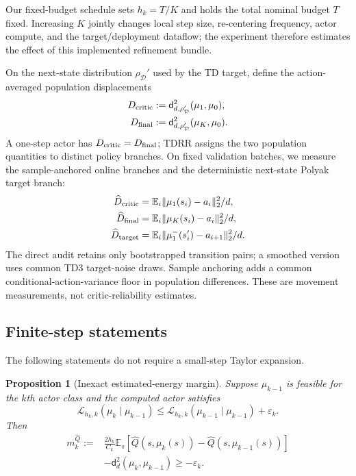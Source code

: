 \documentclass[letterpaper]{article}
\newtheorem{proposition}{Proposition}
\begin{document}
Our fixed-budget schedule sets $h_k=T/K$ and holds the total nominal budget
$T$ fixed. Increasing $K$ jointly changes local step size, re-centering
frequency, actor compute, and the target/deployment dataflow; the experiment
therefore estimates the effect of this implemented refinement bundle.

On the next-state distribution $\rho_{\mathcal D}'$ used by the TD target,
define the action-averaged population displacements
\begin{equation}
\begin{aligned}
D_{\rm critic}&:=\mathsf d_{d,\rho_{\mathcal D}'}^2(\mu_1,\mu_0),\\
D_{\rm final}&:=\mathsf d_{d,\rho_{\mathcal D}'}^2(\mu_K,\mu_0).
\end{aligned}
\label{eq:displacements}
\end{equation}
A one-step actor has $D_{\rm critic}=D_{\rm final}$; TDRR assigns the two
population quantities to distinct policy branches. On fixed validation batches, we measure the sample-anchored online branches
and the deterministic next-state Polyak target branch:
\begin{equation}
\begin{aligned}
\widehat D_{\rm critic}&=\mathbb E_i\|\mu_1(s_i)-a_i\|_2^2/d,\\
\widehat D_{\rm final}&=\mathbb E_i\|\mu_K(s_i)-a_i\|_2^2/d,\\
\widehat D_{\rm target}&=\mathbb E_i\|\mu_1^-(s_i')-a_{i+1}\|_2^2/d.
\end{aligned}
\label{eq:direct_target_displacement}
\end{equation}
The direct audit retains only bootstrapped transition pairs; a smoothed version
uses common TD3 target-noise draws. Sample anchoring adds a common
conditional-action-variance floor in population differences. These are
movement measurements, not critic-reliability estimates.

\subsection{Finite-step statements}

The following statements do not require a small-step Taylor expansion.

\begin{proposition}[Inexact estimated-energy margin]
\label{prop:margin}
Suppose $\mu_{k-1}$ is feasible for the $k$th actor class and the computed
actor satisfies
\begin{equation*}
\mathcal L_{h_k,k}(\mu_k\mid\mu_{k-1})
\leq
\mathcal L_{h_k,k}(\mu_{k-1}\mid\mu_{k-1})+\varepsilon_k.
\end{equation*}
Then
\begin{equation}
\begin{split}
 m_k^{\widehat Q}:={}&
 \frac{2h_k}{C_k}\mathbb E_s
 [\widehat Q(s,\mu_k(s))-\widehat Q(s,\mu_{k-1}(s))]\\
 &-\mathsf d_d^2(\mu_k,\mu_{k-1})
 \geq-\varepsilon_k.
\end{split}
\label{eq:margin}
\end{equation}
\end{proposition}
\end{document}

